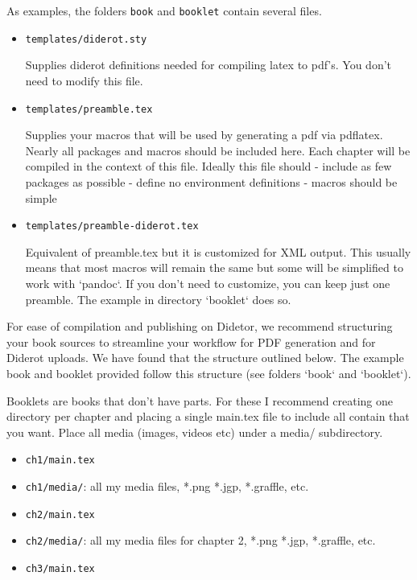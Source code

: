 As examples, 
the folders \lstinline`book` and \lstinline`booklet` contain several files.
%
\begin{itemize}
\item \lstinline`templates/diderot.sty`

   Supplies diderot definitions needed for compiling latex to pdf's.
   You don't need to modify this file.

\item \lstinline`templates/preamble.tex` 

   Supplies your macros that will be used by generating a pdf via pdflatex.  Nearly all packages and macros should be included here.  Each chapter will be compiled in the context of this file.  Ideally this file should
   - include as few packages as possible
   - define no environment definitions
   - macros should be simple

\item \lstinline`templates/preamble-diderot.tex` 

   Equivalent of preamble.tex but it is customized for XML output.  This usually means that most macros will remain the same but some will be simplified to work with `pandoc`.  If you don't need to customize, you can keep just one preamble.  The example in directory `booklet` does so.
\end{itemize}    

For ease of compilation and publishing on Didetor, we recommend
structuring your book sources to streamline your workflow for PDF
generation and for Diderot uploads.  We have found that the structure
outlined below.  The example book and booklet provided follow this
structure (see folders `book` and `booklet`).

\begin{gram}[Booklets]
 
 Booklets are books that don't have parts. For these  I recommend creating one directory per chapter and placing a single main.tex file to include all contain that you want.  Place all media (images, videos etc) under a media/ subdirectory. 
\begin{itemize}  
\item \lstinline`ch1/main.tex`
\item \lstinline`ch1/media/`: all my media files, *.png *.jgp, *.graffle, etc.
\item \lstinline`ch2/main.tex`
\item \lstinline`ch2/media/`: all my media files for chapter 2, *.png *.jgp, *.graffle, etc.
\item \lstinline`ch3/main.tex`
\end{itemize}
\end{gram}

